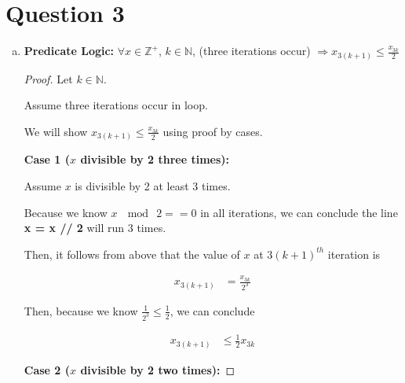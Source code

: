 \documentclass[12pt]{article}
\begin{document}
\section*{Question 3}
\begin{enumerate}[a.]
    \item

    \textbf{Predicate Logic:} $\forall x \in \mathbb{Z}^{+}$, $k \in \mathbb{N}$,
    (three iterations occur) $\Rightarrow x_{3(k+1)} \leq \displaystyle\frac{x_{3k}}{2}$

    \bigskip

    \begin{proof}

        Let $k \in \mathbb{N}$.

        \bigskip

        Assume three iterations occur in loop.

        \bigskip

        We will show $x_{3(k+1)} \leq \displaystyle\frac{x_{3k}}{2}$ using proof by cases.

        \bigskip

        \textbf{Case 1 ($x$ divisible by 2 three times):}

        \bigskip

        Assume $x$ is divisible by 2 at least 3 times.

        \bigskip

        Because we know $x\:\mod\:2 == 0$ in all iterations, we can conclude
        the line \textbf{x = x // 2} will run 3 times.

        \bigskip

        Then, it follows from above that the value of $x$ at $3(k+1)^{th}$ iteration
        is

        \begin{align}
            x_{3(k+1)} &= \frac{x_{3k}}{2^3}
        \end{align}

        \bigskip

        Then, because we know $\frac{1}{2^3} \leq \frac{1}{2}$, we can conclude

        \begin{align}
            x_{3(k+1)} &\leq \frac{1}{2} x_{3k}
        \end{align}

        \bigskip

        \textbf{Case 2 ($x$ divisible by 2 two times):}

        \bigskip


\end{proof}
\end{enumerate}
\end{document}
